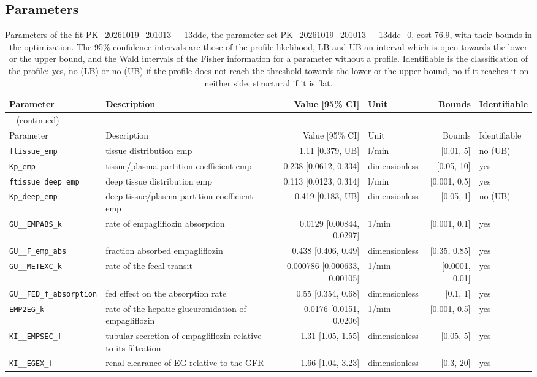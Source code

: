 \subsection{Parameters}

\begin{longtable}{llrlrl}
\caption{Parameters of the fit PK\_20261019\_201013\_\_13ddc, the parameter set PK\_20261019\_201013\_\_13ddc\_0, cost 76.9, with their bounds in the optimization. The 95\% confidence intervals are those of the profile likelihood, LB and UB an interval which is open towards the lower or the upper bound, and the Wald intervals of the Fisher information for a parameter without a profile. Identifiable is the classification of the profile: yes, no (LB) or no (UB) if the profile does not reach the threshold towards the lower or the upper bound, no if it reaches it on neither side, structural if it is flat.}\label{tab:parameters:PK_20261019_201013__13ddc} \\
\toprule
Parameter & Description & Value [95\% CI] & Unit & Bounds & Identifiable \\
\midrule
\endfirsthead
\multicolumn{6}{l}{\small\tablename~\thetable{} (continued)} \\
\toprule
Parameter & Description & Value [95\% CI] & Unit & Bounds & Identifiable \\
\midrule
\endhead
\bottomrule
\endlastfoot
\texttt{ftissue\_emp} & tissue distribution emp & 1.11 [0.379, UB] & l/min & [0.01, 5] & no (UB) \\
\texttt{Kp\_emp} & tissue/plasma partition coefficient emp & 0.238 [0.0612, 0.334] & dimensionless & [0.05, 10] & yes \\
\texttt{ftissue\_deep\_emp} & deep tissue distribution emp & 0.113 [0.0123, 0.314] & l/min & [0.001, 0.5] & yes \\
\texttt{Kp\_deep\_emp} & deep tissue/plasma partition coefficient emp & 0.419 [0.183, UB] & dimensionless & [0.05, 1] & no (UB) \\
\texttt{GU\_\_EMPABS\_k} & rate of empagliflozin absorption & 0.0129 [0.00844, 0.0297] & 1/min & [0.001, 0.1] & yes \\
\texttt{GU\_\_F\_emp\_abs} & fraction absorbed empagliflozin & 0.438 [0.406, 0.49] & dimensionless & [0.35, 0.85] & yes \\
\texttt{GU\_\_METEXC\_k} & rate of the fecal transit & 0.000786 [0.000633, 0.00105] & 1/min & [0.0001, 0.01] & yes \\
\texttt{GU\_\_FED\_f\_absorption} & fed effect on the absorption rate & 0.55 [0.354, 0.68] & dimensionless & [0.1, 1] & yes \\
\texttt{EMP2EG\_k} & rate of the hepatic glucuronidation of empagliflozin & 0.0176 [0.0151, 0.0206] & 1/min & [0.001, 0.5] & yes \\
\texttt{KI\_\_EMPSEC\_f} & tubular secretion of empagliflozin relative to its filtration & 1.31 [1.05, 1.55] & dimensionless & [0.05, 5] & yes \\
\texttt{KI\_\_EGEX\_f} & renal clearance of EG relative to the GFR & 1.66 [1.04, 3.23] & dimensionless & [0.3, 20] & yes \\
\end{longtable}

